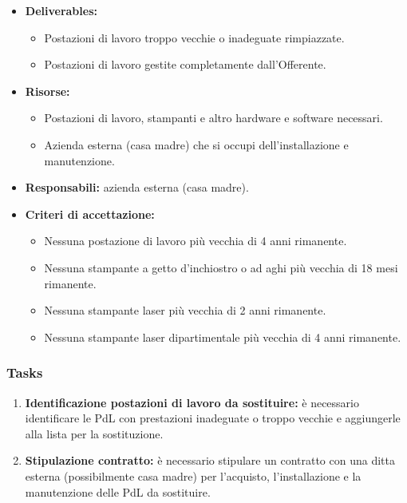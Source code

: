                         
                        
                         \begin{itemize}
               		\item  \textbf{Deliverables:} 
                    \begin{itemize}
                    	\item Postazioni di lavoro troppo vecchie o inadeguate rimpiazzate.
                        \item Postazioni di lavoro gestite completamente dall'Offerente.
                    \end{itemize}
                                       
                    \item  \textbf{Risorse:} 
                	\begin{itemize}
                		\item Postazioni di lavoro, stampanti e altro hardware e software necessari. 
                        \item Azienda esterna (casa madre) che si occupi dell'installazione e manutenzione.
                	\end{itemize}
                    \item  \textbf{Responsabili:} azienda esterna (casa madre).
                    \item  \textbf{Criteri di accettazione:} 
                    \begin{itemize}
                    	\item Nessuna postazione di lavoro più vecchia di 4 anni rimanente.
                        \item Nessuna stampante a getto d'inchiostro o ad aghi più vecchia di 18 mesi rimanente.
                        \item Nessuna stampante laser più vecchia di 2 anni rimanente.
                        \item Nessuna stampante laser dipartimentale più vecchia di 4 anni rimanente.
                    \end{itemize}
                	\end{itemize}
                    
                    \subsubsection*{Tasks}
                    \begin{enumerate}
                    	\item \textbf{Identificazione postazioni di lavoro da sostituire:} è necessario identificare le PdL con prestazioni inadeguate o troppo vecchie e aggiungerle alla lista per la sostituzione.
                        \item \textbf{Stipulazione contratto:} è necessario stipulare un contratto con una ditta esterna (possibilmente casa madre) per l'acquisto, l'installazione e la manutenzione delle PdL da sostituire.
                    \end{enumerate}
                    

